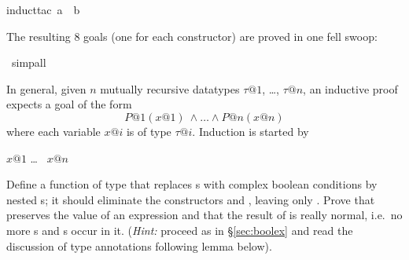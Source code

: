 \begin{isabellebody}
%
\isadelimproof
%
\endisadelimproof
%
\isatagproof
{}\isamarkupfalse%
{\isacharparenleft}induct{\isacharunderscore}tac\ a\ \ b{\isacharparenright}%
\begin{isamarkuptxt}%
\noindent
The resulting 8 goals (one for each constructor) are proved in one fell swoop:%
\end{isamarkuptxt}%
\isamarkuptrue%
\isamarkupfalse%
\ simp{\isacharunderscore}all%
\endisatagproof
{\isafoldproof}%
%
\isadelimproof
%
\endisadelimproof
%
\begin{isamarkuptext}%
In general, given $n$ mutually recursive datatypes $\tau@1$, \dots, $\tau@n$,
an inductive proof expects a goal of the form
\[ P@1(x@1)\ \land \dots \land P@n(x@n) \]
where each variable $x@i$ is of type $\tau@i$. Induction is started by
\begin{isabelle}
 $x@1$  \dots\  $x@n$\isa{{\isacharparenright}}
\end{isabelle}

\begin{exercise}
  Define a function  of type  that
  replaces s with complex boolean conditions by nested
  s; it should eliminate the constructors
   and , leaving only .
  Prove that 
  preserves the value of an expression and that the result of 
  is really normal, i.e.\ no more s and s occur in
  it.  ({\em Hint:} proceed as in \S\ref{sec:boolex} and read the discussion
  of type annotations following lemma  below).
\end{exercise}%
\end{isamarkuptext}%
\isamarkuptrue%
%
\isadelimproof
%
\endisadelimproof
%
\isatagproof
%
\endisatagproof
{\isafoldproof}%
%
\isadelimproof
%
\endisadelimproof
%
\isadelimproof
%
\endisadelimproof
%
\isatagproof
%
\endisatagproof
{\isafoldproof}%
%
\isadelimproof
%
\endisadelimproof
%
\isadelimtheory
%
\endisadelimtheory
%
\isatagtheory
%
\endisatagtheory
{\isafoldtheory}%
%
\isadelimtheory
%
\endisadelimtheory
\end{isabellebody}%
